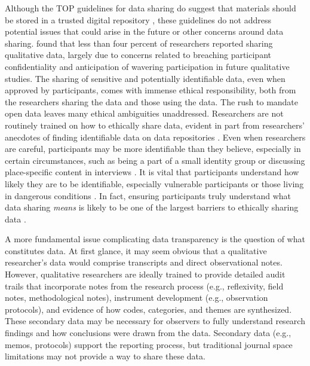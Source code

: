 \documentclass[authordate, meta]{jote-new-article}
\begin{document}
Although the TOP guidelines for data sharing do suggest that materials should be stored in a trusted digital repository \parencites[page 5]{Nosek2015}, these guidelines do not address potential issues that could arise in the future \parencites[e.g., guidelines for updating data;][]{Lash2015} or other concerns around data sharing. \textcites{Mozersky2020} found that less than four percent of researchers reported sharing qualitative data, largely due to concerns related to breaching participant confidentiality and anticipation of wavering participation in future qualitative studies. The sharing of sensitive and potentially identifiable data, even when approved by participants, comes with immense ethical responsibility, both from the researchers sharing the data and those using the data. The rush to mandate open data leaves many ethical ambiguities unaddressed. Researchers are not routinely trained on how to ethically share data, evident in part from researchers’ anecdotes of finding identifiable data on data repositories \parencites[e.g.,][]{Elson2021}. Even when researchers are careful, participants may be more identifiable than they believe, especially in certain circumstances, such as being a part of a small identity group or discussing place-specific content in interviews \parencites{Gow2020}. It is vital that participants understand how likely they are to be identifiable, especially vulnerable participants or those living in dangerous conditions \parencites{Ross2018}{Small2014}. In fact, ensuring participants truly understand what data sharing \emph{means }is likely to be one of the largest barriers to ethically sharing data \parencites{VandeVusse2022}.



A more fundamental issue complicating data transparency is the question of what constitutes data. At first glance, it may seem obvious that a qualitative researcher’s data would comprise transcripts and direct observational notes. However, qualitative researchers are ideally trained to provide detailed audit trails that incorporate notes from the research process (e.g., reflexivity, field notes, methodological notes), instrument development (e.g., observation protocols), and evidence of how codes, categories, and themes are synthesized. These secondary data may be necessary for observers to fully understand research findings and how conclusions were drawn from the data. Secondary data (e.g., memos, protocols) support the reporting process, but traditional journal space limitations may not provide a way to share these data.
\end{document}
